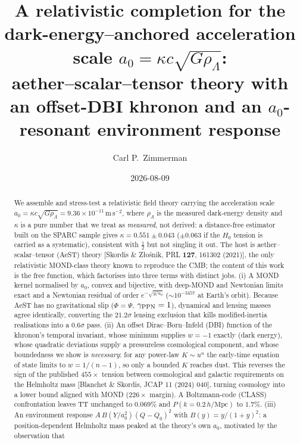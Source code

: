 \documentclass[aps,prd,twocolumn,10pt,nofootinbib,superscriptaddress]{revtex4-2}
\begin{document}
\title{A relativistic completion for the dark-energy--anchored acceleration scale
$a_0=\kappa c\sqrt{G\rho_\Lambda}$:\\
aether--scalar--tensor theory with an offset-DBI khronon and an $a_0$-resonant environment response}

\author{Carl P.\ Zimmerman}
\date{2026-08-09}

\begin{abstract}
We assemble and stress-test a relativistic field theory carrying the acceleration scale
$a_0=\kappa c\sqrt{G\rho_\Lambda}=9.36\times10^{-11}\,\mathrm{m\,s^{-2}}$, where $\rho_\Lambda$ is the
measured dark-energy density and $\kappa$ is a pure number that we treat as \emph{measured}, not
derived: a distance-free estimator built on the SPARC sample gives $\kappa=0.551\pm0.043$
($\pm0.063$ if the $H_0$ tension is carried as a systematic), consistent with $\tfrac12$ but not
singling it out. The host is aether--scalar--tensor (AeST) theory [Skordis \& Z\l o\'snik, PRL
\textbf{127}, 161302 (2021)], the only relativistic MOND-class theory known to reproduce the CMB;
the content of this work is the free function, which factorises into three terms with distinct jobs.
(i) A MOND kernel normalised by $a_0$, convex and bijective, with deep-MOND and Newtonian limits
exact and a Newtonian residual of order $e^{-\sqrt{g/a_0}}$ ($\sim10^{-3457}$ at Earth's orbit).
Because AeST has no gravitational slip ($\Phi=\Psi$, $\gamma_{\rm PPN}=1$), dynamical and lensing
masses agree identically, converting the $21.2\sigma$ lensing exclusion that kills modified-inertia
realisations into a $0.6\sigma$ pass. (ii) An offset Dirac--Born--Infeld (DBI) function of the
khronon's temporal invariant, whose minimum supplies $w=-1$ exactly (dark energy), whose quadratic
deviations supply a pressureless cosmological component, and whose boundedness we show is
\emph{necessary}: for any power-law $K\sim u^n$ the early-time equation of state limits to
$w=1/(n-1)$, so only a bounded $K$ reaches dust. This reverses the sign of the published $455\times$
tension between cosmological and galactic requirements on the Helmholtz mass [Blanchet \& Skordis,
JCAP 11 (2024) 040], turning cosmology into a lower bound aligned with MOND ($226\times$ margin).
A Boltzmann-code (CLASS) confrontation leaves TT unchanged to $0.069\%$ and $P(k=0.2\,h/\mathrm{Mpc})$
to $1.7\%$. (iii) An environment response $A\,B(Y/a_0^2)(Q-Q_0)^2$ with $B(y)=y/(1+y)^2$: a
position-dependent Helmholtz mass peaked at the theory's own $a_0$, motivated by the observation that

\end{abstract}
\end{document}
